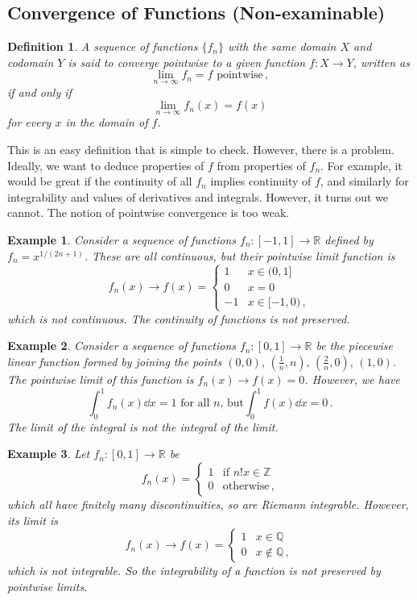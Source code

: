 \documentclass{article}
\theoremstyle{plain}\theoremheaderfont{\normalfont\itshape}\theorembodyfont{\rmfamily}\theoremseparator{.}\newtheorem*{rem}{Remark}\newtheorem*{ex}{Example}\newtheorem*{proof}{Proof}\newtheorem*{altp}{Alternative proof}
\theoremstyle{plain}\theoremheaderfont{\normalfont\bfseries}\theorembodyfont{\rmfamily}\theoremseparator{.}\newtheorem{thm}{Theorem}[section]\newtheorem{lem}[thm]{Lemma}\newtheorem{prop}[thm]{Proposition}\newtheorem*{cor}{Corollary}\newtheorem{defn}[thm]{Definition}\newtheorem{clm}[thm]{Claim}\newtheorem{clminproof}{Claim}
\theoremstyle{break}\theoremheaderfont{\normalfont\itshape}\theorembodyfont{\rmfamily}\theoremseparator{.\medskip}\newtheorem*{proofskip}{Proof}\newtheorem*{exs}{Examples}\newtheorem*{rems}{Remarks}
\theoremstyle{break}\theoremheaderfont{\normalfont\bfseries}\theorembodyfont{\rmfamily}\theoremseparator{.\medskip}\newtheorem{lemskip}[thm]{Lemma}\newtheorem{defnskip}[thm]{Definition}\newtheorem{propskip}[thm]{Proposition}\newtheorem{thmskip}[thm]{Theorem}
\numberwithin{equation}{section}
\begin{document}
	\subsection{Convergence of Functions (Non-examinable)}
	\begin{defn}
		A sequence of functions \(\{f_n\}\) with the same domain \(X\) and codomain \(Y\) is said to \textit{converge pointwise} to a given function \(f:X\to Y\), written as
		\[\lim_{n\to\infty}f_n=f\text{ pointwise}\,,\]
		if and only if
		\[\lim_{n\to\infty}f_n(x)=f(x)\]
		for every \(x\) in the domain of \(f\).
	\end{defn}
	This is an easy definition that is simple to check. However, there is a problem. Ideally, we want to deduce properties of \(f\) from properties of \(f_n\). For example, it would be great if the continuity of all \(f_n\) implies continuity of \(f\), and similarly for integrability and values of derivatives and integrals. However, it turns out we cannot. The notion of pointwise convergence is too weak.
	\begin{ex}
		Consider a sequence of functions \(f_n:[-1,1]\to\mathbb{R}\) defined by \(f_n=x^{1/(2n+1)}\). These are all continuous, but their pointwise limit function is
		\[f_n(x)\to f(x)=\begin{cases}
			1 & x\in(0,1]\\
			0 & x=0\\
			-1 & x\in[-1,0)\,,
		\end{cases}\]
		which is not continuous. The continuity of functions is not preserved.
	\end{ex}
	\begin{ex}
		Consider a sequence of functions \(f_n:[0,1]\to\mathbb{R}\) be the piecewise linear function formed by joining the points \((0,0),\,(\frac{1}{n},n),\,(\frac{2}{n},0),\,(1,0)\). The pointwise limit of this function is \(f_n(x)\to f(x)=0\). However, we have
		\[\int_{0}^{1}f_n(x)\dd{x}=1\text{ for all }n\text{, but}\int_0^1 f(x)\dd{x}=0\,.\]
		The limit of the integral is not the integral of the limit.
	\end{ex}
	\begin{ex}
		Let \(f_n:[0,1]\to\mathbb{R}\) be
		\[f_n(x)=\begin{cases}
			1 & \text{if }n! x\in\mathbb{Z}\\
			0 & \text{otherwise}\,,
		\end{cases}\]
		which all have finitely many discontinuities, so are Riemann integrable. However, its limit is
		\[f_n(x)\to f(x)=\begin{cases}
			1 & x\in\mathbb{Q}\\
			0 & x\notin\mathbb{Q}\,,
		\end{cases}\]
		which is not integrable. So the integrability of a function is not preserved by pointwise
		limits.
	\end{ex}
\end{document}

